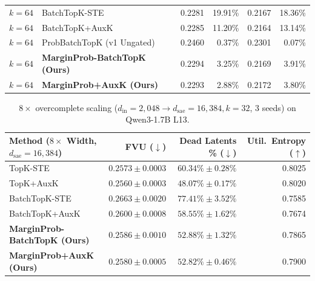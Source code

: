 \documentclass[10pt,twocolumn]{article}
\begin{document}
\begin{table}[t]
{\begin{tabular}{llrrrr}
    $k=64$ & BatchTopK-STE \citep{bussmann2024batchtopk} & 0.2281 & 19.91\% & 0.2167 & 18.36\% \\
    $k=64$ & BatchTopK+AuxK \citep{bussmann2024batchtopk} & 0.2285 & 11.20\% & 0.2164 & 13.14\% \\
    $k=64$ & ProbBatchTopK (v1 Ungated) & 0.2460 & 0.37\% & 0.2301 & 0.07\% \\
    $k=64$ & \textbf{MarginProb-BatchTopK (Ours)} & 0.2294 & 3.25\% & 0.2169 & 3.91\% \\
    $k=64$ & \textbf{MarginProb+AuxK (Ours)} & 0.2293 & 2.88\% & 0.2172 & 3.80\% \\
    \bottomrule
  \end{tabular}}
\end{table}

\begin{table}[t]
  \centering
  \caption{$8\times$ overcomplete scaling ($d_{\mathrm{in}}=2{,}048 \to d_{\mathrm{sae}}=16{,}384, k=32$, 3 seeds) on Qwen3-1.7B L13.}
  \label{tab:sae_8x}
  \scriptsize
  \begin{tabular}{lrrr}
    \toprule
    Method ($8\times$ Width, $d_{\mathrm{sae}}=16{,}384$) & FVU ($\downarrow$) & Dead Latents \% ($\downarrow$) & Util.\ Entropy ($\uparrow$) \\
    \midrule
        TopK-STE \citep{gao2024scaling} & $0.2573\pm0.0003$ & $60.34\%\pm0.28\%$ & 0.8025 \\
    TopK+AuxK \citep{gao2024scaling} & $0.2560\pm0.0003$ & $48.07\%\pm0.17\%$ & 0.8020 \\
    BatchTopK-STE \citep{bussmann2024batchtopk} & $0.2663\pm0.0020$ & $77.41\%\pm3.52\%$ & 0.7585 \\
    BatchTopK+AuxK \citep{bussmann2024batchtopk} & $0.2600\pm0.0008$ & $58.55\%\pm1.62\%$ & 0.7674 \\
    \textbf{MarginProb-BatchTopK (Ours)} & $0.2586\pm0.0010$ & $52.88\%\pm1.32\%$ & 0.7865 \\
    \textbf{MarginProb+AuxK (Ours)} & $0.2580\pm0.0005$ & $52.82\%\pm0.46\%$ & 0.7900 \\
    \bottomrule
  \end{tabular}
\end{table}
\end{document}
